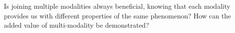 Is joining multiple modalities always beneficial, knowing that each modality provides us with different properties of the same phenomenon? 
How can the added value of multi-modality be demonstrated?